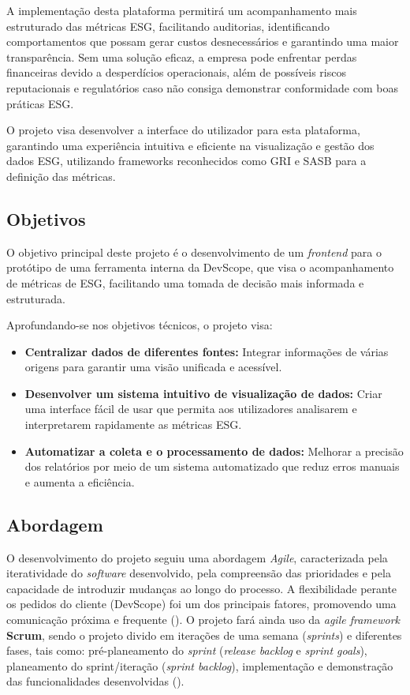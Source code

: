 A implementação desta plataforma permitirá um acompanhamento mais estruturado das métricas ESG, facilitando auditorias, identificando comportamentos que possam gerar custos desnecessários e garantindo uma maior transparência. Sem uma solução eficaz, a empresa pode enfrentar perdas financeiras devido a desperdícios operacionais, além de possíveis riscos reputacionais e regulatórios caso não consiga demonstrar conformidade com boas práticas ESG.

O projeto visa desenvolver a interface do utilizador para esta plataforma, garantindo uma experiência intuitiva e eficiente na visualização e gestão dos dados ESG, utilizando frameworks reconhecidos como GRI e SASB para a definição das métricas.


\subsection{Objetivos}

O objetivo principal deste projeto é o desenvolvimento de um \textit{frontend} para o protótipo de uma ferramenta interna da DevScope, que visa o acompanhamento de métricas de \gls{ESG}, facilitando uma tomada de decisão mais informada e estruturada.

Aprofundando-se nos objetivos técnicos, o projeto visa:
\begin{itemize}
    \item \textbf{Centralizar dados de diferentes fontes:} Integrar informações de várias origens para garantir uma visão unificada e acessível.
    \item \textbf{Desenvolver um sistema intuitivo de visualização de dados:} Criar uma interface fácil de usar que permita aos utilizadores analisarem e interpretarem rapidamente as métricas ESG.
    \item \textbf{Automatizar a coleta e o processamento de dados:} Melhorar a precisão dos relatórios por meio de um sistema automatizado que reduz erros manuais e aumenta a eficiência.
\end{itemize}


\subsection{Abordagem} 

O desenvolvimento do projeto seguiu uma abordagem \textit{Agile}, caracterizada pela iteratividade do \textit{software} desenvolvido, pela compreensão das prioridades e pela capacidade de introduzir mudanças ao longo do processo. A flexibilidade perante os pedidos do cliente (DevScope) foi um dos principais fatores, promovendo uma comunicação próxima e frequente (\cite{Patel2025}). O projeto fará ainda uso da \textit{agile framework} \textbf{Scrum}, sendo o projeto divido em iterações de uma semana (\textit{sprints}) e diferentes fases, tais como: pré-planeamento do \textit{sprint} (\textit{release backlog} e \textit{sprint goals}), planeamento do sprint/iteração (\textit{sprint backlog}), implementação e demonstração das funcionalidades desenvolvidas (\cite{Cohen2004}).

